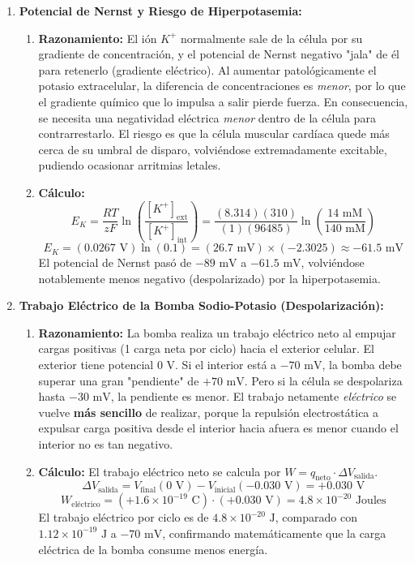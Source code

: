 \documentclass[11pt,letterpaper]{article}
\begin{document}
\begin{enumerate}[leftmargin=*]
    \item \textbf{Potencial de Nernst y Riesgo de Hiperpotasemia:}
    \begin{enumerate}
        \item \textbf{Razonamiento:} El ión $K^+$ normalmente sale de la célula por su gradiente de concentración, y el potencial de Nernst negativo "jala" de él para retenerlo (gradiente eléctrico). Al aumentar patológicamente el potasio extracelular, la diferencia de concentraciones es \textit{menor}, por lo que el gradiente químico que lo impulsa a salir pierde fuerza. En consecuencia, se necesita una negatividad eléctrica \textit{menor} dentro de la célula para contrarrestarlo. El riesgo es que la célula muscular cardíaca quede más cerca de su umbral de disparo, volviéndose extremadamente excitable, pudiendo ocasionar arritmias letales.
        \item \textbf{Cálculo:}
        \[
        E_K = \frac{RT}{zF} \ln\left( \frac{[K^+]_{\text{ext}}}{[K^+]_{\text{int}}} \right) = \frac{(8.314)(310)}{(1)(96485)} \ln\left( \frac{14 \text{ mM}}{140 \text{ mM}} \right)
        \]
        \[
        E_K = (0.0267 \text{ V}) \ln(0.1) = (26.7 \text{ mV}) \times (-2.3025) \approx -61.5 \text{ mV}
        \]
        El potencial de Nernst pasó de $-89 \text{ mV}$ a $-61.5 \text{ mV}$, volviéndose notablemente menos negativo (despolarizado) por la hiperpotasemia.
    \end{enumerate}

    \vspace{0.2cm}

    \item \textbf{Trabajo Eléctrico de la Bomba Sodio-Potasio (Despolarización):}
    \begin{enumerate}
        \item \textbf{Razonamiento:} La bomba realiza un trabajo eléctrico neto al empujar cargas positivas (1 carga neta por ciclo) hacia el exterior celular. El exterior tiene potencial $0 \text{ V}$. Si el interior está a $-70 \text{ mV}$, la bomba debe superar una gran "pendiente" de $+70 \text{ mV}$. Pero si la célula se despolariza hasta $-30 \text{ mV}$, la pendiente es menor. El trabajo netamente \textit{eléctrico} se vuelve \textbf{más sencillo} de realizar, porque la repulsión electrostática a expulsar carga positiva desde el interior hacia afuera es menor cuando el interior no es tan negativo.
        \item \textbf{Cálculo:} El trabajo eléctrico neto se calcula por $W = q_{\text{neto}} \cdot \Delta V_{\text{salida}}$.
        \[
        \Delta V_{\text{salida}} = V_{\text{final}} (0 \text{ V}) - V_{\text{inicial}} (-0.030 \text{ V}) = +0.030 \text{ V}
        \]
        \[
        W_{\text{eléctrico}} = (+1.6 \times 10^{-19} \text{ C}) \cdot (+0.030 \text{ V}) = 4.8 \times 10^{-20} \text{ Joules}
        \]
        El trabajo eléctrico por ciclo es de $4.8 \times 10^{-20} \text{ J}$, comparado con $1.12 \times 10^{-19} \text{ J}$ a $-70 \text{ mV}$, confirmando matemáticamente que la carga eléctrica de la bomba consume menos energía.
    \end{enumerate}

\end{enumerate}
\end{document}
